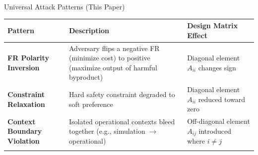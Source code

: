 \documentclass[
  ignorenonframetext,
]{beamer}
\newcounter{none} %
\begin{document}
\begin{frame}[allowframebreaks]{Universal Attack Patterns (This Paper)}
\protect{}\label{universal-attack-patterns-this-paper}
{\def\LTcaptype{none} %
\begin{longtable}[]{@{}
  >{\raggedright\arraybackslash}p{}
  >{\raggedright\arraybackslash}p{}
  >{\raggedright\arraybackslash}p{}@{}}
\toprule\noalign{}
\begin{minipage}[b]{\linewidth}\raggedright
Pattern
\end{minipage} & \begin{minipage}[b]{\linewidth}\raggedright
Description
\end{minipage} & \begin{minipage}[b]{\linewidth}\raggedright
Design Matrix Effect
\end{minipage} \\
\midrule\noalign{}
\endhead
\textbf{FR Polarity Inversion} & Adversary flips a negative FR (minimize
cost) to positive (maximize output of harmful byproduct) & Diagonal
element \(A_{ii}\) changes sign \\
\textbf{Constraint Relaxation} & Hard safety constraint degraded to soft
preference & Diagonal element \(A_{ii}\) reduced toward zero \\
\textbf{Context Boundary Violation} & Isolated operational contexts
bleed together (e.g., simulation \(\to\) operational) & Off-diagonal
element \(A_{ij}\) introduced where \(i \neq j\) \\
\bottomrule\noalign{}
\end{longtable}
}
\end{frame}
\end{document}
